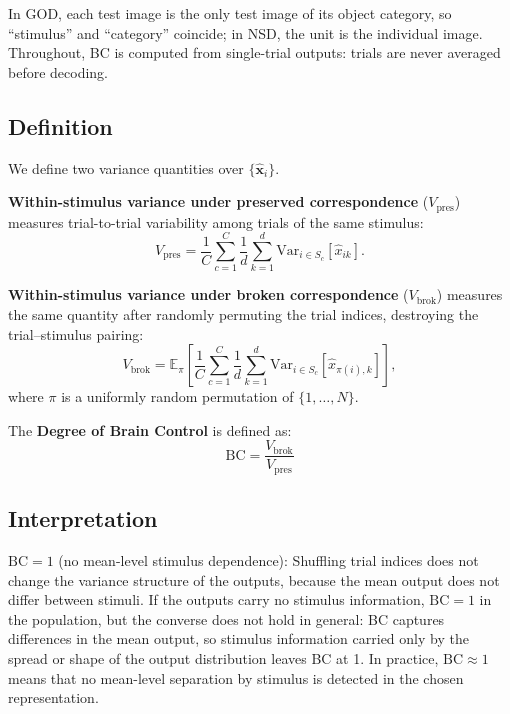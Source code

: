\documentclass[11pt,a4paper]{article}
\begin{document}
In GOD, each test image is the only test image of its object category, so
``stimulus'' and ``category'' coincide; in NSD, the unit is the individual image.
Throughout, BC is computed from single-trial outputs: trials are never averaged
before decoding.

\subsection{Definition}

We define two variance quantities over $\{\hat{\mathbf{x}}_i\}$.

\textbf{Within-stimulus variance under preserved correspondence}
($V_\mathrm{pres}$) measures trial-to-trial variability among trials of the same
stimulus:
\begin{equation}
  V_\mathrm{pres}
  = \frac{1}{C}\sum_{c=1}^{C}\frac{1}{d}\sum_{k=1}^{d}
    \mathrm{Var}_{i\in S_c}[\hat{x}_{ik}].
\end{equation}

\textbf{Within-stimulus variance under broken correspondence}
($V_\mathrm{brok}$) measures the same quantity after randomly permuting the
trial indices, destroying the trial--stimulus pairing:
\begin{equation}
  V_\mathrm{brok}
  = \mathbb{E}_{\pi}\!\left[
    \frac{1}{C}\sum_{c=1}^{C}\frac{1}{d}\sum_{k=1}^{d}
    \mathrm{Var}_{i\in S_c}[\hat{x}_{\pi(i),k}]
  \right],
\end{equation}
where $\pi$ is a uniformly random permutation of $\{1,\ldots,N\}$.

The \textbf{Degree of Brain Control} is defined as:
\begin{equation}
  \boxed{
    \mathrm{BC} = \frac{V_\mathrm{brok}}{V_\mathrm{pres}}
  }
  \label{eq:bc}
\end{equation}

\subsection{Interpretation}

\textbf{$\mathrm{BC}=1$} (no mean-level stimulus dependence): Shuffling trial
indices does not change the variance structure of the outputs, because the mean
output does not differ between stimuli. If the outputs carry no stimulus
information, $\mathrm{BC}=1$ in the population, but the converse does not hold
in general: BC captures differences in the mean output, so stimulus information
carried only by the spread or shape of the output distribution leaves BC at 1.
In practice, $\mathrm{BC}\approx1$ means that no mean-level separation by
stimulus is detected in the chosen representation.
\end{document}
